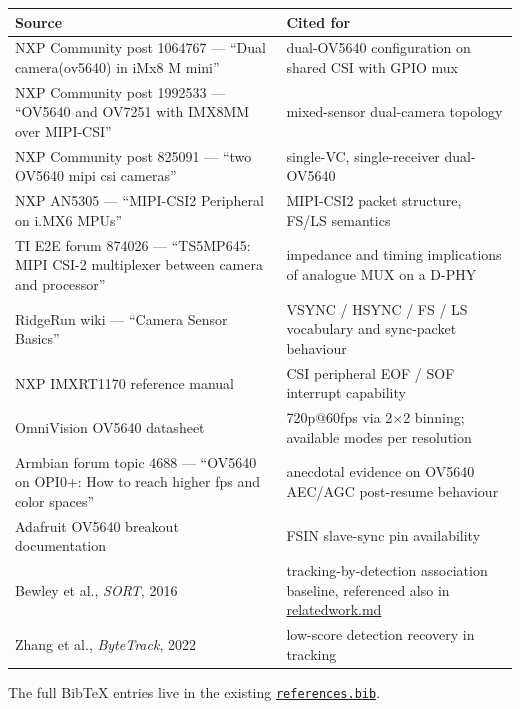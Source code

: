 {\def\LTcaptype{none} %
\begin{longtable}[]{@{}
  >{\raggedright\arraybackslash}p{}
  >{\raggedright\arraybackslash}p{}@{}}
\toprule\noalign{}
\begin{minipage}[b]{\linewidth}\raggedright
Source
\end{minipage} & \begin{minipage}[b]{\linewidth}\raggedright
Cited for
\end{minipage} \\
\midrule\noalign{}
\endhead
\bottomrule\noalign{}
\endlastfoot
NXP Community post 1064767 --- ``Dual camera(ov5640) in iMx8 M mini'' &
dual-OV5640 configuration on shared CSI with GPIO mux \\
NXP Community post 1992533 --- ``OV5640 and OV7251 with IMX8MM over
MIPI-CSI'' & mixed-sensor dual-camera topology \\
NXP Community post 825091 --- ``two OV5640 mipi csi cameras'' &
single-VC, single-receiver dual-OV5640 \\
NXP AN5305 --- ``MIPI-CSI2 Peripheral on i.MX6 MPUs'' & MIPI-CSI2 packet
structure, FS/LS semantics \\
TI E2E forum 874026 --- ``TS5MP645: MIPI CSI-2 multiplexer between
camera and processor'' & impedance and timing implications of analogue
MUX on a D-PHY \\
RidgeRun wiki --- ``Camera Sensor Basics'' & VSYNC / HSYNC / FS / LS
vocabulary and sync-packet behaviour \\
NXP IMXRT1170 reference manual & CSI peripheral EOF / SOF interrupt
capability \\
OmniVision OV5640 datasheet & 720p@60fps via 2×2 binning; available
modes per resolution \\
Armbian forum topic 4688 --- ``OV5640 on OPI0+: How to reach higher fps
and color spaces'' & anecdotal evidence on OV5640 AEC/AGC post-resume
behaviour \\
Adafruit OV5640 breakout documentation & FSIN slave-sync pin
availability \\
Bewley et al., \emph{SORT}, 2016 & tracking-by-detection association
baseline, referenced also in \url{relatedwork.md} \\
Zhang et al., \emph{ByteTrack}, 2022 & low-score detection recovery in
tracking \\
\end{longtable}
}

The full BibTeX entries live in the existing
\href{references.bib}{\texttt{references.bib}}.
